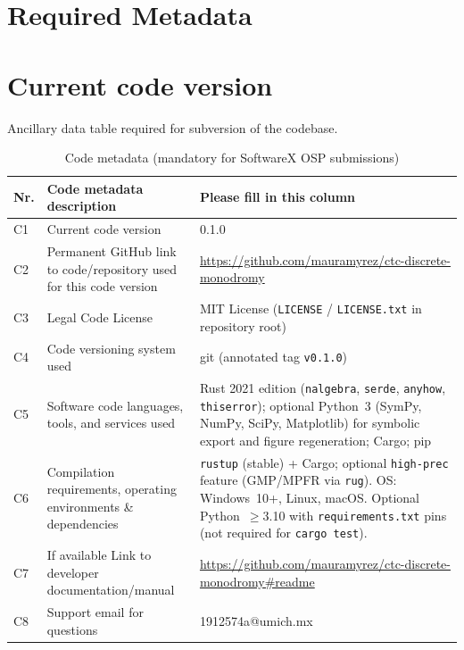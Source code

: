 \documentclass[preprint,12pt,a4paper]{elsarticle}
\begin{document}
\section*{Required Metadata}
\label{sec:required-metadata}

\section*{Current code version}
\label{sec:code-version}

Ancillary data table required for subversion of the codebase.

\begin{table}[H]
\small
\begin{tabular}{|l|p{5.2cm}|p{6.8cm}|}
\hline
\textbf{Nr.} & \textbf{Code metadata description} & \textbf{Please fill in this column} \\
\hline
C1 & Current code version & 0.1.0 \\
\hline
C2 & Permanent GitHub link to code/repository used for this code version & \url{https://github.com/mauramyrez/ctc-discrete-monodromy} \\
\hline
C3 & Legal Code License & MIT License (\texttt{LICENSE} / \texttt{LICENSE.txt} in repository root) \\
\hline
C4 & Code versioning system used & git (annotated tag \texttt{v0.1.0}) \\
\hline
C5 & Software code languages, tools, and services used & Rust 2021 edition (\texttt{nalgebra}, \texttt{serde}, \texttt{anyhow}, \texttt{thiserror}); optional Python~3 (SymPy, NumPy, SciPy, Matplotlib) for symbolic export and figure regeneration; Cargo; pip \\
\hline
C6 & Compilation requirements, operating environments \& dependencies & \texttt{rustup} (stable) + Cargo; optional \texttt{high-prec} feature (GMP/MPFR via \texttt{rug}). OS: Windows~10+, Linux, macOS. Optional Python~$\ge$3.10 with \texttt{requirements.txt} pins (not required for \texttt{cargo test}). \\
\hline
C7 & If available Link to developer documentation/manual & \url{https://github.com/mauramyrez/ctc-discrete-monodromy\#readme} \\
\hline
C8 & Support email for questions & 1912574a@umich.mx \\
\hline
\end{tabular}
\caption{Code metadata (mandatory for SoftwareX OSP submissions)}
\label{tab:code-meta}
\end{table}
\end{document}
